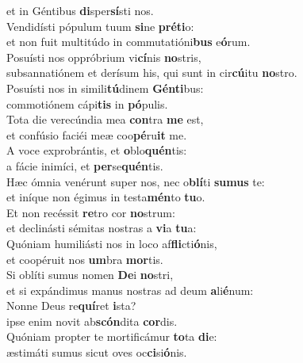 \oddverse et in Géntibus \textbf{di}sper\textbf{sí}sti nos.\\
\evenverse Vendidísti pópulum tuum \textbf{si}ne \textbf{pré}\textbf{ti}o:~\*\\
\evenverse et non fuit multitúdo in commutatióni\textbf{bus} e\textbf{ó}rum.\\
\oddverse Posuísti nos oppróbrium vi\textbf{cí}nis \textbf{no}stris,~\*\\
\oddverse subsannatiónem et derísum his, qui sunt in cir\textbf{cú}itu \textbf{no}stro.\\
\evenverse Posuísti nos in simili\textbf{tú}dinem \textbf{Gén}\textbf{ti}bus:~\*\\
\evenverse commotiónem cápi\textbf{tis} in \textbf{pó}pulis.\\
\oddverse Tota die verecúndia mea \textbf{con}tra \textbf{me} est,~\*\\
\oddverse et confúsio faciéi meæ coo\textbf{pé}ru\textbf{it} me.\\
\evenverse A voce exprobrántis, et \textbf{o}blo\textbf{quén}tis:~\*\\
\evenverse a fácie inimíci, et \textbf{per}se\textbf{quén}tis.\\
\oddverse Hæc ómnia venérunt super nos, nec o\textbf{blí}ti \textbf{su}\textbf{mus} te:~\*\\
\oddverse et iníque non égimus in testa\textbf{mén}to \textbf{tu}o.\\
\evenverse Et non recéssit \textbf{re}tro cor \textbf{no}strum:~\*\\
\evenverse et declinásti sémitas nostras a \textbf{vi}a \textbf{tu}a:\\
\oddverse Quóniam humiliásti nos in loco af\textbf{fli}cti\textbf{ó}nis,~\*\\
\oddverse et coopéruit nos \textbf{um}bra \textbf{mor}tis.\\
\evenverse Si oblíti sumus nomen \textbf{De}i \textbf{no}stri,~\*\\
\evenverse et si expándimus manus nostras ad deum \textbf{a}li\textbf{é}num:\\
\oddverse Nonne Deus re\textbf{quí}ret \textbf{i}sta?~\*\\
\oddverse ipse enim novit ab\textbf{scón}dita \textbf{cor}dis.\\
\evenverse Quóniam propter te mortificámur \textbf{to}ta \textbf{di}e:~\*\\
\evenverse æstimáti sumus sicut oves oc\textbf{ci}si\textbf{ó}nis.\\
